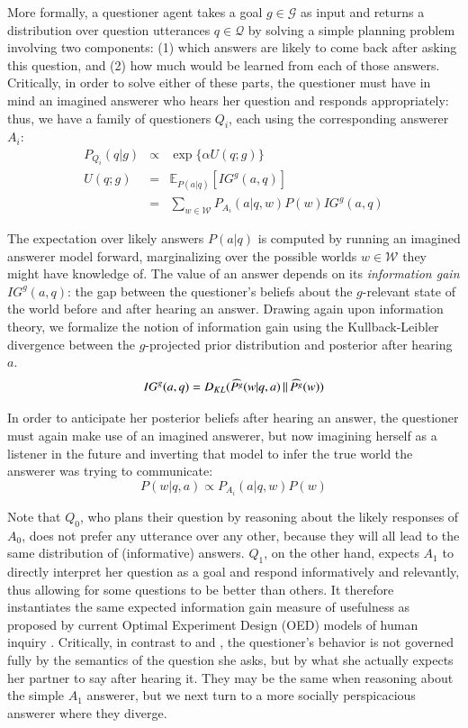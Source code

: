 \documentclass[12pt, floatsintext, jou]{apa6}
\newcommand{\KL}[2]{\ensuremath{D_{KL}({#1}\, \| \, {#2})}}
\newcommand{\E}[2]{\ensuremath{\mathbb{E}_{#1}\left [#2 \right]}}
\begin{document}
More formally, a questioner agent takes a goal $g \in \mathcal{G}$ as input and returns a distribution over question utterances $q \in \mathcal{Q}$ by solving a simple planning problem involving two components: (1) which answers are likely to come back after asking this question, and (2) how much would be learned from each of those answers. Critically, in order to solve either of these parts, the questioner must have in mind an imagined answerer who hears her question and responds appropriately: thus, we have a family of questioners $Q_i$, each using the corresponding answerer $A_i$:
%
$$
\begin{array}{lcl}
P_{Q_i}(q|g)  & \propto & \exp\{\alpha U(q;g)\} \\
U(q;g) & = & \E{P(a|q)}{IG^g(a,q)} \\
	 & = & \sum_{w\in\mathcal{W}} P_{A_i}(a|q,w)P(w) IG^g(a,q)
\end{array}
$$
%

The expectation over likely answers $P(a|q)$ is computed by running an imagined answerer model forward, marginalizing over the possible worlds $w \in\mathcal{W}$ they might have knowledge of. The value of an answer depends on its \emph{information gain} $IG^g(a,q)$: the gap between the questioner's beliefs about the $g$-relevant state of the world before and after hearing an answer. Drawing again upon information theory, we formalize the notion of information gain using the Kullback-Leibler divergence between the $g$-projected prior distribution and posterior after hearing $a$.
%
$$
IG^g(a,q) = \KL{\widehat{P^g}(w|q, a)}{\widehat{P^g}(w)}\\
$$
%

In order to anticipate her posterior beliefs after hearing an answer, the questioner must again make use of an imagined answerer, but now imagining herself as a listener in the future and inverting that model to infer the true world the answerer was trying to communicate:
$$P(w|q,a) \propto P_{A_i}(a| q, w)P(w)$$

Note that $Q_0$, who plans their question by reasoning about the likely responses of $A_0$, does not prefer any utterance over any other, because they will all lead to the same distribution of (informative) answers. $Q_1$, on the other hand, expects $A_1$ to directly interpret her question as a goal and respond informatively and relevantly, thus allowing for some questions to be better than others. It therefore instantiates the same expected information gain measure of usefulness as proposed by current Optimal Experiment Design (OED) models of human inquiry \cite{coenen2018asking}. Critically, in contrast to  and , the questioner's behavior is not governed fully by the semantics of the question she asks, but by what she actually expects her partner to say after hearing it. They may be the same when reasoning about the simple $A_1$ answerer, but we next turn to a more socially perspicacious answerer where they diverge.
\end{document}
